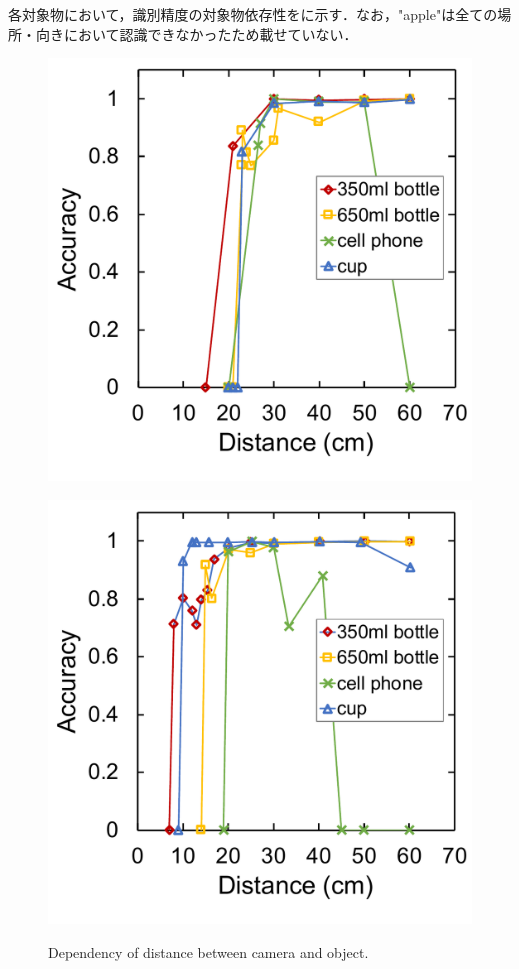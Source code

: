 各対象物において，識別精度の対象物依存性をに示す．なお，"apple"は全ての場所・向きにおいて認識できなかったため載せていない．
\begin{figure}[H]
    \centering
    \begin{minipage}{0.45\columnwidth}
        \centering
        \includegraphics[width=0.95\linewidth]{figure/chapter4/mrcnn_depth}
        \label{fig:mrcnn距離そのまま}
    \end{minipage}
    \begin{minipage}{0.45\columnwidth}
        \centering
        \includegraphics[width=0.95\linewidth]{figure/chapter4/mrcnn_depth_padding}
        \label{fig:mrcnn距離パディング}
    \end{minipage}
    \caption{Dependency of distance between camera and object.}
    \label{fig:mrcnn距離}
\end{figure}
